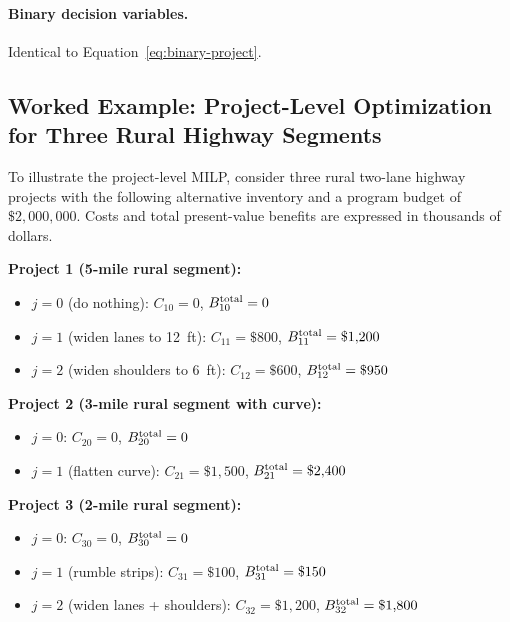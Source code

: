 \paragraph{Binary decision variables.} Identical to
Equation~\ref{eq:binary-project}.

\subsection{Worked Example: Project-Level Optimization for Three Rural Highway Segments}
\label{sec:milp-worked}

To illustrate the project-level MILP, consider three rural two-lane
highway projects with the following alternative inventory and a program
budget of $\$2{,}000{,}000$. Costs and total present-value benefits are
expressed in thousands of dollars.

\textbf{Project 1 (5-mile rural segment):}
\begin{itemize}[leftmargin=2em, itemsep=2pt]
  \item $j = 0$ (do nothing): $C_{10} = 0$, $B^{\mathrm{total}}_{10} = 0$
  \item $j = 1$ (widen lanes to 12~ft): $C_{11} = \$800$, $B^{\mathrm{total}}_{11} = \$1{,}200$
  \item $j = 2$ (widen shoulders to 6~ft): $C_{12} = \$600$, $B^{\mathrm{total}}_{12} = \$950$
\end{itemize}

\textbf{Project 2 (3-mile rural segment with curve):}
\begin{itemize}[leftmargin=2em, itemsep=2pt]
  \item $j = 0$: $C_{20} = 0$, $B^{\mathrm{total}}_{20} = 0$
  \item $j = 1$ (flatten curve): $C_{21} = \$1{,}500$, $B^{\mathrm{total}}_{21} = \$2{,}400$
\end{itemize}

\textbf{Project 3 (2-mile rural segment):}
\begin{itemize}[leftmargin=2em, itemsep=2pt]
  \item $j = 0$: $C_{30} = 0$, $B^{\mathrm{total}}_{30} = 0$
  \item $j = 1$ (rumble strips): $C_{31} = \$100$, $B^{\mathrm{total}}_{31} = \$150$
  \item $j = 2$ (widen lanes + shoulders): $C_{32} = \$1{,}200$, $B^{\mathrm{total}}_{32} = \$1{,}800$
\end{itemize}

